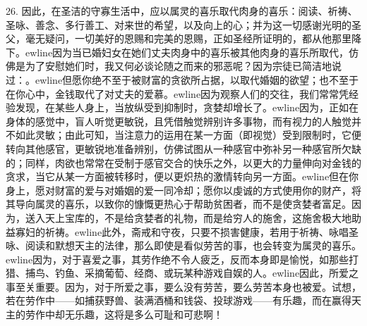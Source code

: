 26. 因此，在圣洁的守寡生活中，应以属灵的喜乐取代肉身的喜乐：阅读、祈祷、圣咏、善念、多行善工、对来世的希望，以及向上的心；并为这一切感谢光明的圣父，毫无疑问，一切美好的恩赐和完美的恩赐，正如圣经所证明的，都从他那里降下。\newline{}ewline{}因为当已婚妇女在她们丈夫肉身中的喜乐被其他肉身的喜乐所取代，仿佛是为了安慰她们时，我又何必谈论随之而来的邪恶呢？因为宗徒已简洁地说过：。\newline{}ewline{}但愿你绝不至于被财富的贪欲所占据，以取代婚姻的欲望；也不至于在你心中，金钱取代了对丈夫的爱慕。\newline{}ewline{}因为观察人们的交往，我们常常凭经验发现，在某些人身上，当放纵受到抑制时，贪婪却增长了。\newline{}ewline{}因为，正如在身体的感觉中，盲人听觉更敏锐，且凭借触觉辨别许多事物，而有视力的人触觉并不如此灵敏；由此可知，当注意力的运用在某一方面（即视觉）受到限制时，它便转向其他感官，更敏锐地准备辨别，仿佛试图从一种感官中弥补另一种感官所欠缺的；同样，肉欲也常常在受制于感官交合的快乐之外，以更大的力量伸向对金钱的贪求，当它从某一方面被转移时，便以更炽热的激情转向另一方面。\newline{}ewline{}但在你身上，愿对财富的爱与对婚姻的爱一同冷却；愿你以虔诚的方式使用你的财产，将其导向属灵的喜乐，以致你的慷慨更热心于帮助贫困者，而不是使贪婪者富足。因为，送入天上宝库的，不是给贪婪者的礼物，而是给穷人的施舍，这施舍极大地助益寡妇的祈祷。\newline{}ewline{}此外，斋戒和守夜，只要不损害健康，若用于祈祷、咏唱圣咏、阅读和默想天主的法律，那么即使是看似劳苦的事，也会转变为属灵的喜乐。\newline{}ewline{}因为，对于喜爱之事，其劳作绝不令人疲乏，反而本身即是愉悦，如那些打猎、捕鸟、钓鱼、采摘葡萄、经商、或玩某种游戏自娱的人。\newline{}ewline{}因此，所爱之事至关重要。因为，对于所爱之事，要么没有劳苦，要么劳苦本身也被爱。试想，若在劳作中——如捕获野兽、装满酒桶和钱袋、投球游戏——有乐趣，而在赢得天主的劳作中却无乐趣，这将是多么可耻和可悲啊！\par

